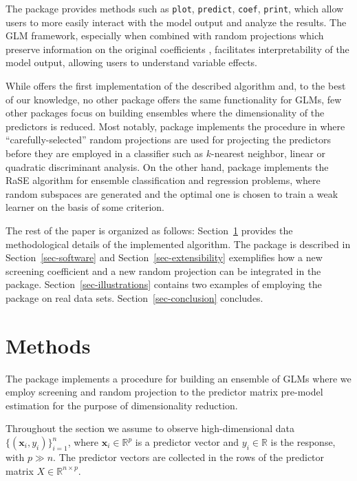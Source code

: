 \documentclass[
  article,
  nojss]{jss}
\begin{document}
The package provides methods such as \texttt{plot}, \texttt{predict},
\texttt{coef}, \texttt{print}, which allow users to more easily interact
with the model output and analyze the results. The GLM framework,
especially when combined with random projections which preserve
information on the original coefficients \citep[such as the one
in][]{parzer2024glms}, facilitates interpretability of the model output,
allowing users to understand variable effects.

While  offers the first implementation of the described
algorithm and, to the best of our knowledge, no other package offers the
same functionality for GLMs, few other  packages focus on
building ensembles where the dimensionality of the predictors is
reduced. Most notably, package  \citep{RPEnsembleR}
implements the procedure in \citet{cannings2017random} where
``carefully-selected'' random projections are used for projecting the
predictors before they are employed in a classifier such as
\(k\)-nearest neighbor, linear or quadratic discriminant analysis. On
the other hand, package  \citep{pkg:RaSEn} implements the
RaSE algorithm for ensemble classification and regression problems,
where random subspaces are generated and the optimal one is chosen to
train a weak learner on the basis of some criterion.

The rest of the paper is organized as follows: Section~\ref{sec-models}
provides the methodological details of the implemented algorithm. The
package is described in Section~\ref{sec-software} and
Section~\ref{sec-extensibility} exemplifies how a new screening
coefficient and a new random projection can be integrated in the
package. Section~\ref{sec-illustrations} contains two examples of
employing the package on real data sets. Section~\ref{sec-conclusion}
concludes.

\section{Methods}\label{sec-models}

The package implements a procedure for building an ensemble of GLMs
where we employ screening and random projection to the predictor matrix
pre-model estimation for the purpose of dimensionality reduction.

Throughout the section we assume to observe high-dimensional data
\(\{(\boldsymbol{x}_i,y_i)\}_{i=1}^n\), where
\(\boldsymbol{x}_i\in\mathbb{R}^p\) is a predictor vector and
\(y_i\in\mathbb{R}\) is the response, with \(p\gg n\). The predictor
vectors are collected in the rows of the predictor matrix
\(X\in \mathbb R^{n\times p}\).
\end{document}
